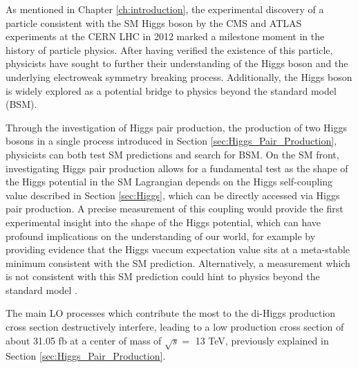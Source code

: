 As mentioned in Chapter \ref{ch:introduction}, the experimental discovery of a particle consistent with the SM Higgs boson by the CMS and ATLAS experiments at the CERN LHC in 2012 marked a milestone moment in the history of particle physics. After having verified the existence of this particle, physicists
have sought to further their understanding of the Higgs boson and the underlying electroweak symmetry breaking process. Additionally, the Higgs boson
is widely explored as a potential bridge to physics beyond the standard model (BSM).

Through the investigation of Higgs pair production, the production of two Higgs bosons in a single process introduced in Section \ref{sec:Higgs_Pair_Production}, physicists can both test SM predictions and 
search for BSM. On the SM front, investigating Higgs pair production allows for a fundamental test as the shape of the Higgs potential in the SM Lagrangian 
depends on the Higgs self-coupling value described in Section \ref{sec:Higgs}, which can be directly accessed via Higgs pair production. A precise measurement of this coupling would provide the first experimental insight 
into the shape of the Higgs potential, which can have profound implications on the understanding of our world, for example by providing evidence that the Higgs vaccum expectation value sits at a 
meta-stable minimum consistent with the SM prediction. Alternatively, a measurement which is not consistent with this SM prediction could hint to physics beyond the standard model \cite{10.3389/fspas.2018.00040}. 

The main LO processes which contribute the most to the di-Higgs production cross section destructively interfere, leading to a low production cross section of about 31.05 fb at a center of mass of $\sqrt{s} = $ 13 TeV, previously explained in Section \ref{sec:Higgs_Pair_Production}. 



